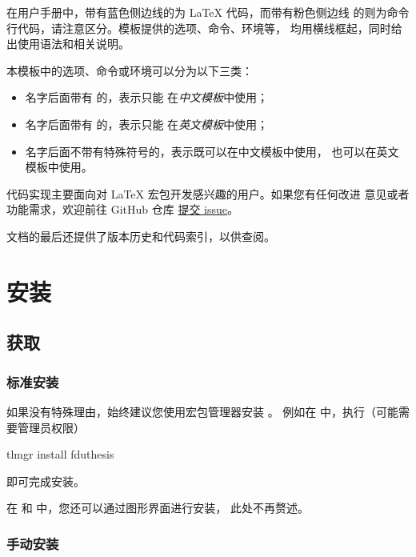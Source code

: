 \documentclass{ccnudoc}
\begin{document}
在用户手册中，带有蓝色侧边线的为 \LaTeX{} 代码，而带有粉色侧边线
的则为命令行代码，请注意区分。模板提供的选项、命令、环境等，
均用横线框起，同时给出使用语法和相关说明。

本模板中的选项、命令或环境可以分为以下三类：
\begin{itemize}
  \item 名字后面带有 \rexptarget\rexpstar{} 的，表示只能
    在\emph{中文模板}中使用；
  \item 名字后面带有 \exptarget\expstar{} 的，表示只能
    在\emph{英文模板}中使用；
  \item 名字后面不带有特殊符号的，表示既可以在中文模板中使用，
    也可以在英文模板中使用。
\end{itemize}

代码实现主要面向对 \LaTeX{} 宏包开发感兴趣的用户。如果您有任何改进
意见或者功能需求，欢迎前往 GitHub 仓库
\href{https://github.com/stone-zeng/fduthesis/issues}{提交 issue}。

文档的最后还提供了版本历史和代码索引，以供查阅。

\section{安装}

\subsection{获取 }

\subsubsection{标准安装}

如果没有特殊理由，始终建议您使用宏包管理器安装 。
例如在 \TeXLive{} 中，执行（可能需要管理员权限）
\begin{shellexample}[morekeywords={tlmgr,install}]
  tlmgr install fduthesis
\end{shellexample}
即可完成安装。

在 \TeXLive{} 和 \MiKTeX{} 中，您还可以通过图形界面进行安装，
此处不再赘述。

\subsubsection{手动安装}
\end{document}
